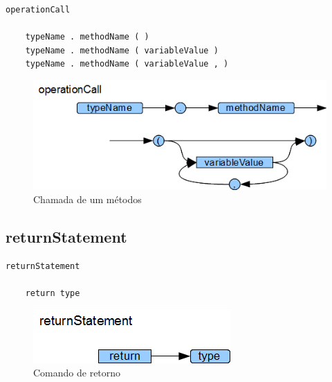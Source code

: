 \begin{lstlisting}
operationCall

	typeName . methodName ( )
	typeName . methodName ( variableValue )
	typeName . methodName ( variableValue , )

\end{lstlisting}

\begin{figure}[h!]
 \centering
 \includegraphics{capitulo09/operationCall.png}
 \caption{Chamada de um métodos}
\end{figure}
\subsection{returnStatement}

\begin{lstlisting}
returnStatement

    return type

\end{lstlisting}

\begin{figure}[h!]
 \centering
 \includegraphics{capitulo09/returnStatement.png}
 \caption{Comando de retorno}
\end{figure}